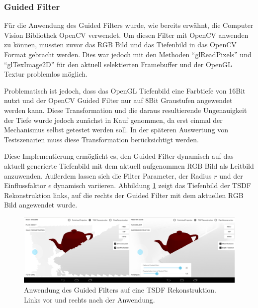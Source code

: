 \subsubsection*{Guided Filter}

Für die Anwendung des Guided Filters wurde, wie bereits erwähnt, die Computer Vision Bibliothek OpenCV verwendet. Um diesen Filter mit OpenCV anwenden zu können, mussten zuvor das RGB Bild und das Tiefenbild in das OpenCV Format gebracht werden. Dies war jedoch mit den Methoden \enquote{glReadPixels} und \enquote{glTexImage2D} für den aktuell selektierten Framebuffer und der OpenGL Textur problemlos möglich. 

Problematisch ist jedoch, dass das OpenGL Tiefenbild eine Farbtiefe von 16Bit nutzt und der OpenCV Guided Filter nur auf 8Bit Graustufen angewendet werden kann. Diese Transformation und die daraus resultierende Ungenauigkeit der Tiefe wurde jedoch zunächst in Kauf genommen, da erst einmal der Mechanismus selbst getestet werden soll. In der späteren Auswertung von Testszenarien muss diese Transformation berücksichtigt werden. 

Diese Implementierung ermöglicht es, den Guided Filter dynamisch auf das aktuell generierte Tiefenbild mit dem aktuell aufgenommen RGB Bild als Leitbild anzuwenden. Außerdem lassen sich die Filter Parameter, der Radius \(r\) und der Einflussfaktor \(\epsilon\) dynamisch variieren. Abbildung \ref{fig:filter-demo} zeigt das Tiefenbild der TSDF Rekonstruktion links, auf die rechts der Guided Filter mit dem aktuellen RGB Bild angewendet wurde. 

\begin{figure}[h]
  \centering
	\includegraphics[width=1.0\textwidth]{content/images/implementation/filter-demo.png} 
  \caption{Anwendung des Guided Filters auf eine TSDF Rekonstruktion. Links vor und rechts nach der Anwendung.}
  \label{fig:filter-demo}
\end{figure}
